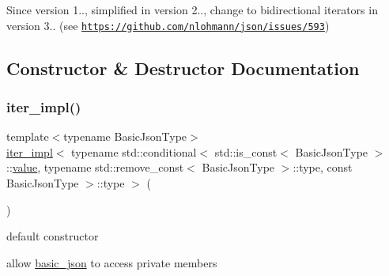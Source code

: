 \begin{DoxySince}{Since}
version 1.., simplified in version 2.., change to bidirectional iterators in version 3.. (see \href{https://github.com/nlohmann/json/issues/593}{\tt https\+://github.\+com/nlohmann/json/issues/593}) 
\end{DoxySince}


\subsection{Constructor \& Destructor Documentation}
\mbox{\label{classnlohmann_1_1detail_1_1iter__impl_a19aa457f9c4af1b7e3af59839132cc5c}} 
\subsubsection{\texorpdfstring{iter\+\_\+impl()}{iter\_impl()}\hspace{0.1cm}{\footnotesize\ttfamily [1/3]}}
{\footnotesize\ttfamily template$<$typename Basic\+Json\+Type$>$ \\
\hyperlink{classnlohmann_1_1detail_1_1iter__impl}{iter\+\_\+impl}$<$ typename std\+::conditional$<$ std\+::is\+\_\+const$<$ Basic\+Json\+Type $>$\+::\hyperlink{classnlohmann_1_1detail_1_1iter__impl_ab447c50354c6611fa2ae0100ac17845c}{value}, typename std\+::remove\+\_\+const$<$ Basic\+Json\+Type $>$\+::type, const Basic\+Json\+Type $>$\+::type $>$ (\begin{DoxyParamCaption}{ }\end{DoxyParamCaption})\hspace{0.3cm}{\ttfamily [default]}}



default constructor 

allow \hyperlink{classnlohmann_1_1basic__json}{basic\+\_\+json} to access private members \mbox{\label{classnlohmann_1_1detail_1_1iter__impl_a88a00484ac201c52fc5f613d88a2918b}} 
